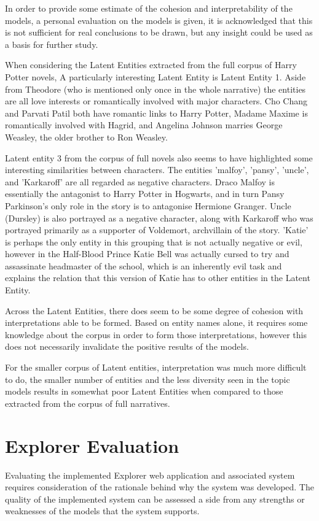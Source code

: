 \documentclass[10pt]{report}
\begin{document}
In order to provide some estimate of the cohesion and interpretability of the models, a personal evaluation on the models is given, it is acknowledged that this is not sufficient for real conclusions to be drawn, but any insight could be used as a basis for further study.

When considering the Latent Entities extracted from the full corpus of Harry Potter novels, A particularly interesting Latent Entity is Latent Entity 1. Aside from Theodore (who is mentioned only once in the whole narrative) the entities are all love interests or romantically involved with major characters. Cho Chang and Parvati Patil both have romantic links to Harry Potter, Madame Maxime is romantically involved with Hagrid, and Angelina Johnson marries George Weasley, the older brother to Ron Weasley.

Latent entity 3 from the corpus of full novels also seems to have highlighted some interesting similarities between characters. The entities 'malfoy', 'pansy', 'uncle', and 'Karkaroff' are all regarded as negative characters. Draco Malfoy is essentially the antagonist to Harry Potter in Hogwarts, and in turn Pansy Parkinson's only role in the story is to antagonise Hermione Granger. Uncle (Dursley) is also portrayed as a negative character, along with Karkaroff who was portrayed primarily as a supporter of Voldemort, archvillain of the story. 'Katie' is perhaps the only entity in this grouping that is not actually negative or evil, however in the Half-Blood Prince Katie Bell was actually cursed to try and assassinate headmaster of the school, which is an inherently evil task and explains the relation that this version of Katie has to other entities in the Latent Entity.

Across the Latent Entities, there does seem to be some degree of cohesion with interpretations able to be formed. Based on entity names alone, it requires some knowledge about the corpus in order to form those interpretations, however this does not necessarily invalidate the positive results of the models.

For the smaller corpus of Latent entities, interpretation was much more difficult to do, the smaller number of entities and the less diversity seen in the topic models results in somewhat poor Latent Entities when compared to those extracted from the corpus of full narratives.

\section{Explorer Evaluation}
Evaluating the implemented Explorer web application and associated system requires consideration of the rationale behind why the system was developed. The quality of the implemented system can be assessed a side from any strengths or weaknesses of the models that the system supports.
\end{document}
